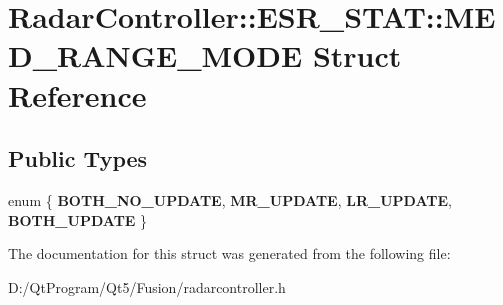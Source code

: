 \hypertarget{struct_radar_controller_1_1_e_s_r___s_t_a_t_1_1_m_e_d___r_a_n_g_e___m_o_d_e}{}\section{Radar\+Controller\+:\+:E\+S\+R\+\_\+\+S\+T\+A\+T\+:\+:M\+E\+D\+\_\+\+R\+A\+N\+G\+E\+\_\+\+M\+O\+D\+E Struct Reference}
\label{struct_radar_controller_1_1_e_s_r___s_t_a_t_1_1_m_e_d___r_a_n_g_e___m_o_d_e}
\subsection*{Public Types}
\begin{DoxyCompactItemize}
\item 
\hypertarget{struct_radar_controller_1_1_e_s_r___s_t_a_t_1_1_m_e_d___r_a_n_g_e___m_o_d_e_aa59703ad227d33f68c1fdd4db0a61daf}{}enum \{ {\bfseries B\+O\+T\+H\+\_\+\+N\+O\+\_\+\+U\+P\+D\+A\+T\+E}, 
{\bfseries M\+R\+\_\+\+U\+P\+D\+A\+T\+E}, 
{\bfseries L\+R\+\_\+\+U\+P\+D\+A\+T\+E}, 
{\bfseries B\+O\+T\+H\+\_\+\+U\+P\+D\+A\+T\+E}
 \}\label{struct_radar_controller_1_1_e_s_r___s_t_a_t_1_1_m_e_d___r_a_n_g_e___m_o_d_e_aa59703ad227d33f68c1fdd4db0a61daf}

\end{DoxyCompactItemize}


The documentation for this struct was generated from the following file\+:\begin{DoxyCompactItemize}
\item 
D\+:/\+Qt\+Program/\+Qt5/\+Fusion/radarcontroller.\+h\end{DoxyCompactItemize}
